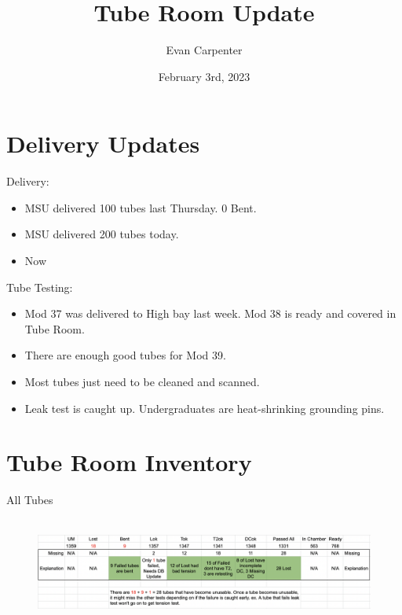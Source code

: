 \documentclass{beamer}
\title{Tube Room Update}
\author{Evan Carpenter}
\date{February 3rd, 2023}
\begin{document}
\begin{frame}
	\titlepage
\end{frame}
\section{Delivery Updates}
	\begin{frame}
		\begin{block}{Delivery:}
			\begin{itemize}
				\item \small MSU delivered 100 tubes last Thursday. 0 Bent. 
				\item MSU delivered 200 tubes today.
				\item Now
			\end{itemize}
		\end{block}	
		\begin{block}{Tube Testing:}
			\begin{itemize}
				\item Mod 37 was delivered to High bay last week. Mod 38 is ready and covered in Tube Room. 
				\item There are enough good tubes for Mod 39.
				\item Most tubes just need to be cleaned and scanned. 
				\item Leak test is caught up. Undergraduates are heat-shrinking grounding pins. 
			\end{itemize}
		\end{block}
	\end{frame}


\section{Tube Room Inventory}
		\begin{frame}{All Tubes}
			\begin{figure}
				\centering
				\scalebox{0.6}{}
				\\
				\vspace{0.5cm}
				\includegraphics[width=0.8\pdfpagewidth]{UMMissingTubeExplanation.png}
			\end{figure}
			
		\end{frame}
		
\end{document}
